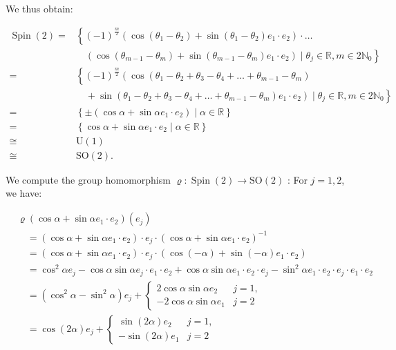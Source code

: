 \documentclass[10pt, letterpaper]{article}
\begin{document}
We thus obtain:

$$
\begin{aligned}
\operatorname{Spin}(2)= & \left\{(-1)^{\frac{m}{2}}\left(\cos \left(\theta_{1}-\theta_{2}\right)+\sin \left(\theta_{1}-\theta_{2}\right) e_{1} \cdot e_{2}\right) \cdot \ldots\right. \\
& \left.\quad\left(\cos \left(\theta_{m-1}-\theta_{m}\right)+\sin \left(\theta_{m-1}-\theta_{m}\right) e_{1} \cdot e_{2}\right) \mid \theta_{j} \in \mathbb{R}, m \in 2 \mathbb{N}_{0}\right\} \\
= & \left\{( - 1 ) ^ { \frac { m } { 2 } } \left(\cos \left(\theta_{1}-\theta_{2}+\theta_{3}-\theta_{4}+\ldots+\theta_{m-1}-\theta_{m}\right)\right.\right. \\
& \left.\left.\quad+\sin \left(\theta_{1}-\theta_{2}+\theta_{3}-\theta_{4}+\ldots+\theta_{m-1}-\theta_{m}\right) e_{1} \cdot e_{2}\right) \mid \theta_{j} \in \mathbb{R}, m \in 2 \mathbb{N}_{0}\right\} \\
= & \left\{ \pm\left(\cos \alpha+\sin \alpha e_{1} \cdot e_{2}\right) \mid \alpha \in \mathbb{R}\right\} \\
= & \left\{\cos \alpha+\sin \alpha e_{1} \cdot e_{2} \mid \alpha \in \mathbb{R}\right\} \\
\cong & \mathrm{U}(1) \\
\cong & \mathrm{SO}(2) .
\end{aligned}
$$

We compute the group homomorphism $\varrho: \operatorname{Spin}(2) \rightarrow \mathrm{SO}(2)$ : For $j=1,2$, we have:

$$
\begin{aligned}
& \varrho\left(\cos \alpha+\sin \alpha e_{1} \cdot e_{2}\right)\left(e_{j}\right) \\
& \quad=\left(\cos \alpha+\sin \alpha e_{1} \cdot e_{2}\right) \cdot e_{j} \cdot\left(\cos \alpha+\sin \alpha e_{1} \cdot e_{2}\right)^{-1} \\
& \quad=\left(\cos \alpha+\sin \alpha e_{1} \cdot e_{2}\right) \cdot e_{j} \cdot\left(\cos (-\alpha)+\sin (-\alpha) e_{1} \cdot e_{2}\right) \\
& \quad=\cos ^{2} \alpha e_{j}-\cos \alpha \sin \alpha e_{j} \cdot e_{1} \cdot e_{2}+\cos \alpha \sin \alpha e_{1} \cdot e_{2} \cdot e_{j}-\sin ^{2} \alpha e_{1} \cdot e_{2} \cdot e_{j} \cdot e_{1} \cdot e_{2} \\
& \quad=\left(\cos ^{2} \alpha-\sin ^{2} \alpha\right) e_{j}+ \begin{cases}2 \cos \alpha \sin \alpha e_{2} & j=1, \\
-2 \cos \alpha \sin \alpha e_{1} & j=2\end{cases} \\
& \quad=\cos (2 \alpha) e_{j}+ \begin{cases}\sin (2 \alpha) e_{2} & j=1, \\
-\sin (2 \alpha) e_{1} & j=2\end{cases}
\end{aligned}
$$
\end{document}
